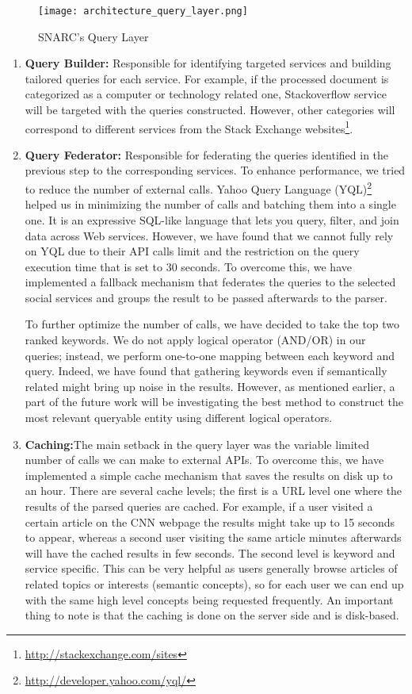 \begin{figure}[!ht]
  \centering
    \texttt{[image: architecture\_query\_layer.png]}
  \caption{SNARC's Query Layer}
  \label{fig:architecture_query_layer}
\end{figure}

\begin{enumerate}
\item {\bf Query Builder:} Responsible for identifying targeted services and building tailored queries for each service. For example, if the processed document is categorized as a computer or technology related one, Stackoverflow service will be targeted with the queries constructed. However, other categories will correspond to different services from the Stack Exchange websites\footnote{\url{http://stackexchange.com/sites}}.
\item {\bf Query Federator:} Responsible for federating the queries identified in the previous step to the corresponding services. To enhance performance, we tried to reduce the number of external calls. Yahoo Query Language (YQL)\footnote{\url{http://developer.yahoo.com/yql/}} helped us in minimizing the number of calls and batching them into a single one. It is an expressive SQL-like language that lets you query, filter, and join data across Web services. However, we have found that we cannot fully rely on YQL due to their API calls limit and the restriction on the query execution time that is set to 30 seconds. To overcome this, we have implemented a fallback mechanism that federates the queries to the selected social services and groups the result to be passed afterwards to the parser.

To further optimize the number of calls, we have decided to take the top two ranked keywords. We do not apply logical operator (AND/OR) in our queries; instead, we perform one-to-one mapping between each keyword and query. Indeed, we have found that gathering keywords even if semantically related might bring up noise in the results. However, as mentioned earlier, a part of the future work will be investigating the best method to construct the most relevant queryable entity using different logical operators.

\item {\bf Caching:}The main setback in the query layer was the variable limited number of calls we can make to external APIs. To overcome this, we have implemented a simple cache mechanism that saves the results on disk up to an hour. There are several cache levels; the first is a URL level one where the results of the parsed queries are cached. For example, if a user visited a certain article on the CNN webpage the results might take up to 15 seconds to appear, whereas a second user visiting the same article minutes afterwards will have the cached results in few seconds. The second level is keyword and service specific. This can be very helpful as users generally browse articles of related topics or interests (semantic concepts), so for each user we can end up with the same high level concepts being requested frequently. An important thing to note is that the caching is done on the server side and is disk-based.
\end{enumerate}

